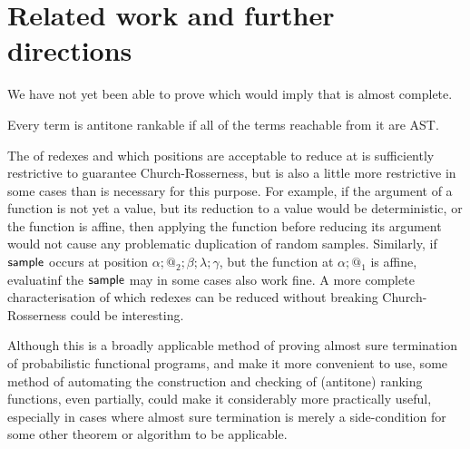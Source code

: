 \section{Related work and further directions}





\label{sec:related}
We have not yet been able to prove  which would imply that  is almost complete.
\begin{conjecture}
\label{conj:antitone}
Every term is antitone rankable if all of the terms reachable from it are AST.
\end{conjecture}

The  of redexes and which positions are acceptable to reduce at is sufficiently restrictive to guarantee Church-Rosserness, but is also a little more restrictive in some cases than is necessary for this purpose. For example, if the argument of a function is not yet a value, but its reduction to a value would be deterministic, or the function is affine, then applying the function before reducing its argument would not cause any problematic duplication of random samples. Similarly, if $\mathsf{sample}$ occurs at position $\alpha;@_2;\beta;\lambda;\gamma$, but the function at $\alpha;@_1$ is affine, evaluatinf the $\mathsf{sample}$ may in some cases also work fine. A more complete characterisation of which redexes can be reduced without breaking Church-Rosserness could be interesting.

Although this is a broadly applicable method of proving almost sure termination of probabilistic functional programs, and  make it more convenient to use, some method of automating the construction and checking of (antitone) ranking functions, even partially, could make it considerably more practically useful, especially in cases where almost sure termination is merely a side-condition for some other theorem or algorithm to be applicable.
